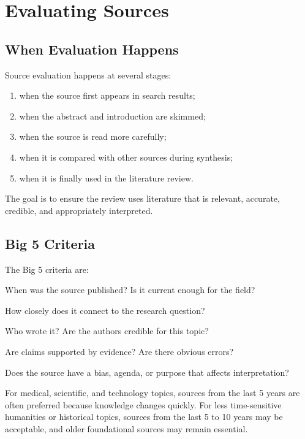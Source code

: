 \documentclass[11pt,letterpaper]{article}
\begin{document}
\section{Evaluating Sources}

\subsection{When Evaluation Happens}

Source evaluation happens at several stages:

\begin{enumerate}
  \item when the source first appears in search results;
  \item when the abstract and introduction are skimmed;
  \item when the source is read more carefully;
  \item when it is compared with other sources during synthesis;
  \item when it is finally used in the literature review.
\end{enumerate}

The goal is to ensure the review uses literature that is relevant, accurate, credible, and appropriately interpreted.

\subsection{Big 5 Criteria}

The Big 5 criteria are:

\begin{description}[leftmargin=1.35in,style=nextline]
  \item[Currency] When was the source published? Is it current enough for the field?
  \item[Coverage/Relevance] How closely does it connect to the research question?
  \item[Authority] Who wrote it? Are the authors credible for this topic?
  \item[Accuracy] Are claims supported by evidence? Are there obvious errors?
  \item[Objectivity/Purpose] Does the source have a bias, agenda, or purpose that affects interpretation?
\end{description}

For medical, scientific, and technology topics, sources from the last 5 years are often preferred because knowledge changes quickly. For less time-sensitive humanities or historical topics, sources from the last 5 to 10 years may be acceptable, and older foundational sources may remain essential.
\end{document}
